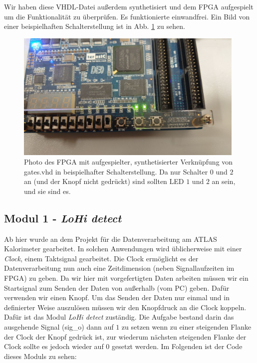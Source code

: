 Wir haben diese VHDL-Datei außerdem synthetisiert und dem FPGA aufgespielt um die Funktionalität zu überprüfen.
Es funktionierte einwandfrei.
Ein Bild von einer beispielhaften Schalterstellung ist in Abb. \ref{photo_gates} zu sehen.

\begin{figure}[ht]
	\centering
    \includegraphics[width=0.98\textwidth]{../Daten/Photo_FPGA_gates.png}
	\caption{Photo des FPGA mit aufgespielter, synthetisierter Verknüpfung von gates.vhd in beispielhafter Schalterstellung. Da nur Schalter $0$ und $2$ an (und der Knopf nicht gedrückt) sind sollten LED $1$ und $2$ an sein, und sie sind es.}
	\label{photo_gates}
\end{figure}

\subsection{Modul 1 - \textit{LoHi detect}}

Ab hier wurde an dem Projekt für die Datenverarbeitung am ATLAS Kalorimeter gearbeitet.
In solchen Anwendungen wird üblicherweise mit einer \textit{Clock}, einem Taktsignal gearbeitet.
Die Clock ermöglicht es der Datenverarbeitung nun auch eine Zeitdimension (neben Signallaufzeiten im FPGA) zu geben.
Da wir hier mit vorgefertigten Daten arbeiten müssen wir ein Startsignal zum Senden der Daten von außerhalb (vom PC) geben.
Dafür verwenden wir einen Knopf.
Um das Senden der Daten nur einmal und in definierter Weise auszulösen müssen wir den Knopfdruck an die Clock koppeln.
Dafür ist das Modul \textit{LoHi detect} zuständig.
Die Aufgabe bestand darin das ausgehende Signal (sig\_o) dann auf $1$ zu setzen wenn zu einer steigenden Flanke der Clock der Knopf gedrück ist, zur wiederum nächsten steigenden Flanke der Clock sollte es jedoch wieder auf $0$ gesetzt werden.
Im Folgenden ist der Code dieses Moduls zu sehen:

